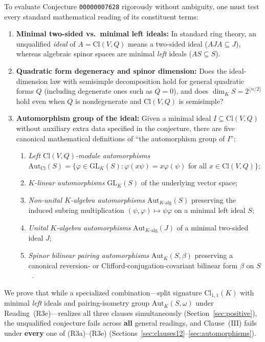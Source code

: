 \documentclass[11pt,a4paper]{article}
\theoremstyle{definition}
\newcommand{\Cl}{\mathrm{Cl}}
\newcommand{\Aut}{\mathrm{Aut}}
\newcommand{\GL}{\mathrm{GL}}
\begin{document}
To evaluate Conjecture \texttt{00000007628} rigorously without ambiguity, one must test every standard mathematical reading of its constituent terms:
\begin{enumerate}
  \item[\textbf{(R1)}] \textbf{Minimal two-sided vs.\ minimal left ideals:} In standard ring theory, an unqualified \emph{ideal} of $A = \Cl(V, Q)$ means a two-sided ideal ($A J A \subseteq J$), whereas algebraic spinor spaces are minimal \emph{left} ideals ($A S \subseteq S$).
  \item[\textbf{(R2)}] \textbf{Quadratic form degeneracy and spinor dimension:} Does the ideal-dimension law with semisimple decomposition hold for general quadratic forms $Q$ (including degenerate ones such as $Q = 0$), and does $\dim_K S = 2^{\lfloor n/2 \rfloor}$ hold even when $Q$ is nondegenerate and $\Cl(V, Q)$ is semisimple?
  \item[\textbf{(R3)}] \textbf{Automorphism group of the ideal:} Given a minimal ideal $I \subseteq \Cl(V, Q)$ without auxiliary extra data specified in the conjecture, there are five canonical mathematical definitions of ``the automorphism group of $I$'':
  \begin{enumerate}
    \item[(a)] \emph{Left $\Cl(V, Q)$-module automorphisms} $\Aut_{\Cl}(S) = \{ \varphi \in \GL_K(S) : \varphi(x\psi) = x\varphi(\psi)$ for all $x \in \Cl(V, Q)\}$;
    \item[(b)] \emph{$K$-linear automorphisms} $\GL_K(S)$ of the underlying vector space;
    \item[(c)] \emph{Non-unital $K$-algebra automorphisms} $\Aut_{K\text{-alg}}(S)$ preserving the induced subring multiplication $(\psi, \varphi) \mapsto \psi\varphi$ on a minimal left ideal $S$;
    \item[(d)] \emph{Unital $K$-algebra automorphisms} $\Aut_{K\text{-alg}}(J)$ of a minimal two-sided ideal $J$;
    \item[(e)] \emph{Spinor bilinear pairing automorphisms} $\Aut_K(S, \beta)$ preserving a canonical reversion- or Clifford-conjugation-covariant bilinear form $\beta$ on $S$~\cite{Porteous1995,Lounesto2001}.
  \end{enumerate}
\end{enumerate}

We prove that while a specialized combination---split signature $\Cl_{1,1}(K)$ with minimal \emph{left} ideals and pairing-isometry group $\Aut_K(S, \omega)$ under Reading~(R3e)---realizes all three clauses simultaneously (Section~\ref{sec:positive}), the unqualified conjecture fails across \textbf{all} general readings, and Clause~(III) fails under \textbf{every} one of (R3a)--(R3e) (Sections~\ref{sec:clauses12}--\ref{sec:automorphisms}).
\end{document}
